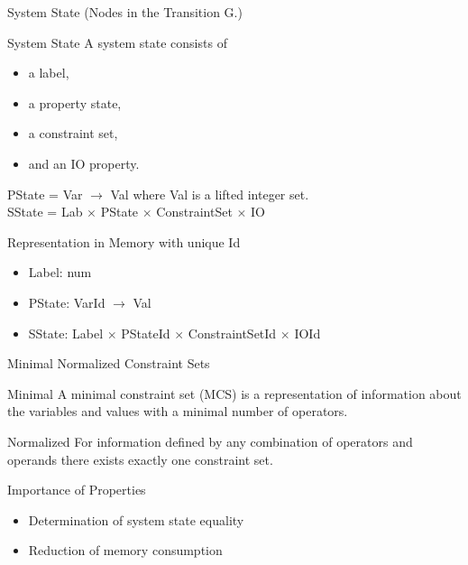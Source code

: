 \begin{frame}{System State (Nodes in the Transition G.)}

\begin{block}{System State}
A system state consists of
\begin{itemize}
\item a label, 
\item a property state,
\item a constraint set,
\item and an IO property.
\end{itemize}

PState = Var $\rightarrow$ Val where Val is a lifted integer set.\\
SState = Lab $\times$ PState $\times$ ConstraintSet $\times$ IO\\
\end{block}

\begin{block}{Representation in Memory with unique Id}
\begin{itemize}
\item Label: num
\item PState: VarId $\rightarrow$ Val
\item SState: Label $\times$ PStateId $\times$ ConstraintSetId $\times$ IOId
\end{itemize}
\end{block}


\end{frame}

\begin{frame}{Minimal Normalized Constraint Sets}
\begin{block}{Minimal}
A minimal constraint set (MCS) is a representation of
information about the variables and values with a minimal number of operators.
\end{block}

\begin{block}{Normalized}
For information defined by any combination of operators and operands there exists exactly one constraint set.
\end{block}

\begin{block}{Importance of Properties}
\begin{itemize}
\item Determination of system state equality
\item Reduction of memory consumption
\end{itemize}
\end{block}

\end{frame}


